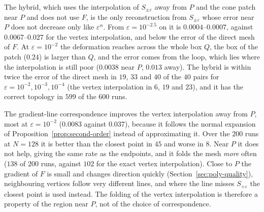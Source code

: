 \documentclass[12pt, a4paper, oneside]{book}
\theoremstyle{plain}
\theoremstyle{definition}
\theoremstyle{remark}
\theoremstyle{definition}
\begin{document}
The hybrid, which uses the interpolation of $S_{\pm\varepsilon}$ away from $P$ and the cone patch near $P$ and does not use $F$, is the only reconstruction from $S_{\pm\varepsilon}$ whose error near $P$ does not decrease only like $\varepsilon^\alpha$. From $\varepsilon=10^{-2.5}$ on it is $0.0004$--$0.0007$, against $0.0067$--$0.027$ for the vertex interpolation, and below the error of the direct mesh of $F$. At $\varepsilon=10^{-2}$ the deformation reaches across the whole box $Q$, the box of the patch ($0.24$) is larger than $Q$, and the error comes from the loop, which lies where the interpolation is still poor ($0.0038$ near $P$, $0.013$ away). The hybrid is within twice the error of the direct mesh in $19$, $33$ and $40$ of the $40$ pairs for $\varepsilon=10^{-2},10^{-3},10^{-4}$ (the vertex interpolation in $6$, $19$ and $23$), and it has the correct topology in $599$ of the $600$ runs.

The gradient-line correspondence improves the vertex interpolation away from $P$, most at $\varepsilon=10^{-2}$ ($0.0083$ against $0.037$), because it follows the normal expansion of Proposition~\ref{prop:second-order} instead of approximating it. Over the $200$ runs at $N=128$ it is better than the closest point in $45$ and worse in $8$. Near $P$ it does not help, giving the same rate as the endpoints, and it folds the mesh \emph{more} often ($138$ of $200$ runs, against $102$ for the exact vertex interpolation). Close to $P$ the gradient of $F$ is small and changes direction quickly (Section~\ref{sec:poly-quality}), neighbouring vertices follow very different lines, and where the line misses $S_{+\varepsilon}$ the closest point is used instead. The folding of the vertex interpolation is therefore a property of the region near $P$, not of the choice of correspondence.
\end{document}
